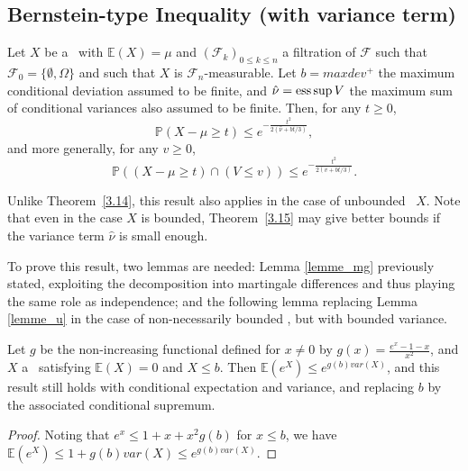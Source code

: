 \subsection{Bernstein-type Inequality (with variance term)}
\begin{theorem} \citep{McDiarmid98}
\label{3.15}
Let $X$ be a \rv~with $\mathbb{E}(X)=\mu$ and $(\mathcal{F}_k)_{0\leq k \leq n}$ a filtration of $\mathcal{F}$ such that $ \mathcal{F}_0 =  \{\emptyset , \Omega\} $ and such that $X$ is $\mathcal{F}_n$-measurable.
Let $b=maxdev^+$ the maximum conditional deviation assumed to be finite, and $\hat\nu=\supess V$ the maximum sum of conditional variances also assumed to be finite.
Then, for any  $t \geq 0$, $$\mathbb{P}(X-\mu \geq t) \leq e^{-\frac{t^2}{2(\hat\nu+bt/3)}},$$
and more generally, for any $v \geq 0$,~ $$\mathbb{P}((X-\mu \geq t)\cap(V \leq v)) \leq e^{-\frac{t^2}{2(v+bt/3)}}.$$
\end{theorem}

Unlike Theorem~\ref{3.14}, this result also applies in the case of unbounded \rv~$X$. Note that even in the case $X$ is bounded, Theorem~\ref{3.15} may give better bounds if the variance term $\hat\nu$ is small enough. 

To prove this result, two lemmas are needed: Lemma \ref{lemme_mg} previously stated, exploiting the decomposition into martingale differences and thus playing the same role as independence; and the following lemma replacing Lemma \ref{lemme_u} in the case of non-necessarily bounded \rv, but with bounded variance.
\begin{lemma}
\label{lemme_u2}
Let $g$ be the non-increasing functional defined for $x \neq 0$ by $g(x)=\frac{e^x-1-x}{x^2}$, and $X$ a \rv~satisfying $\mathbb{E}(X)=0$ and $X \leq b$.
Then $\mathbb{E}(e^X) \leq e^{g(b)var(X)}$, and this result still holds with conditional expectation and variance, and replacing $b$ by the associated conditional supremum.%
\end{lemma}
\begin{proof}
Noting that $e^x \leq 1+x+x^2g(b)$ for $x \leq b$, we have $\mathbb{E}(e^X) \le 1 + g(b) var(X) \le e^{g(b) var(X)}$.
\end{proof}

